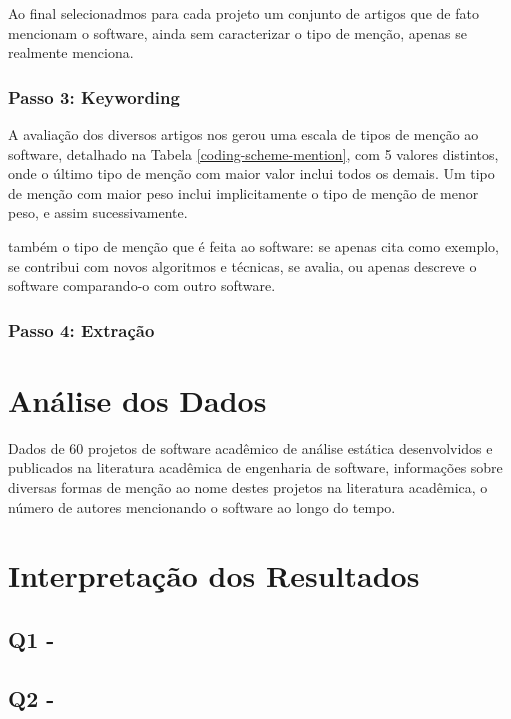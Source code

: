 Ao final selecionadmos para cada projeto um conjunto de artigos que de fato
mencionam o software, ainda sem caracterizar o tipo de menção, apenas se
realmente menciona.

\subsubsection{Passo 3: Keywording}

A avaliação dos diversos artigos nos gerou uma escala de tipos de menção ao
software, detalhado na Tabela \ref{coding-scheme-mention}, com 5 valores
distintos, onde o último tipo de menção com maior valor inclui todos os demais.
Um tipo de menção com maior peso inclui implicitamente o tipo de
menção de menor peso, e assim sucessivamente.

também o tipo de menção que é feita ao software: se apenas cita como exemplo,
se contribui com novos algoritmos e técnicas, se avalia, ou apenas descreve o
software comparando-o com outro software.

\subsubsection{Passo 4: Extração}


\section{Análise dos Dados} %

Dados de 60 projetos de software acadêmico de análise estática desenvolvidos e
publicados na literatura acadêmica de engenharia de software, informações sobre
diversas formas de menção ao nome destes projetos na literatura acadêmica,
o número de autores mencionando o software ao longo do tempo.

\section{Interpretação dos Resultados} %

\subsection{Q1 - \EstudoDoisQuestaoUm}


\subsection{Q2 - \EstudoDoisQuestaoDois}


